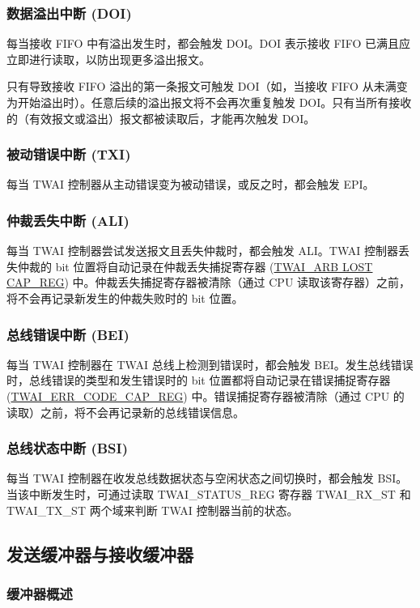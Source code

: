 \documentclass[main\_\_CN.tex]{subfiles}
\begin{document}
\subsubsection{数据溢出中断 (DOI)}
每当接收 FIFO 中有溢出发生时，都会触发 DOI。DOI 表示接收 FIFO 已满且应立即进行读取，以防出现更多溢出报文。

只有导致接收 FIFO 溢出的第一条报文可触发 DOI（如，当接收 FIFO 从未满变为开始溢出时）。任意后续的溢出报文将不会再次重复触发 DOI。只有当所有接收的（有效报文或溢出）报文都被读取后，才能再次触发 DOI。

\subsubsection{被动错误中断 (TXI)}
每当 TWAI 控制器从主动错误变为被动错误，或反之时，都会触发 EPI。

\subsubsection{仲裁丢失中断 (ALI)}
每当 TWAI 控制器尝试发送报文且丢失仲裁时，都会触发 ALI。TWAI 控制器丢失仲裁的 bit 位置将自动记录在仲裁丢失捕捉寄存器 (\hyperref[regdesc:TWAIARB LOST CAPREG]{TWAI\_ARB LOST CAP\_REG}) 中。仲裁丢失捕捉寄存器被清除（通过 CPU 读取该寄存器）之前，将不会再记录新发生的仲裁失败时的 bit 位置。

\subsubsection{总线错误中断 (BEI)}
每当 TWAI 控制器在 TWAI 总线上检测到错误时，都会触发 BEI。发生总线错误时，总线错误的类型和发生错误时的 bit 位置都将自动记录在错误捕捉寄存器 (\hyperref[regdesc:TWAIERRCODECAPREG]{TWAI\_ERR\_CODE\_CAP\_REG}) 中。错误捕捉寄存器被清除（通过 CPU 的读取）之前，将不会再记录新的总线错误信息。

\subsubsection{总线状态中断 (BSI)}
每当 TWAI 控制器在收发总线数据状态与空闲状态之间切换时，都会触发 BSI。当该中断发生时，可通过读取 TWAI\_STATUS\_REG 寄存器 TWAI\_RX\_ST 和 TWAI\_TX\_ST 两个域来判断 TWAI 控制器当前的状态。

\subsection{发送缓冲器与接收缓冲器}
\subsubsection{缓冲器概述}
\end{document}
